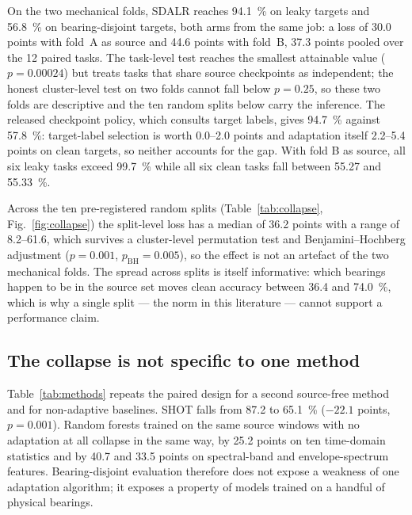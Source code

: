 On the two mechanical folds, SDALR reaches \SI{94.1}{\percent} on leaky targets and \SI{56.8}{\percent} on bearing-disjoint
targets, both arms from the same job: a loss of 30.0 points with fold~A as source and 44.6 points with fold~B, 37.3 points
pooled over the 12 paired tasks. The task-level test reaches the smallest attainable value ($p=0.00024$) but treats tasks
that share source checkpoints as independent; the honest cluster-level test on two folds cannot fall below $p=0.25$, so
these two folds are descriptive and the ten random splits below carry the inference. The released checkpoint policy, which
consults target labels, gives \SI{94.7}{\percent} against \SI{57.8}{\percent}: target-label selection is worth 0.0--2.0
points and adaptation itself 2.2--5.4 points on clean targets, so neither accounts for the gap.
With fold B as source, all six leaky tasks exceed \SI{99.7}{\percent} while all six clean tasks fall between \SI{55.27}{}
and \SI{55.33}{\percent}.

Across the ten pre-registered random splits (Table~\ref{tab:collapse}, Fig.~\ref{fig:collapse}) the split-level loss has a
median of 36.2 points with a range of 8.2--61.6, which survives a cluster-level permutation test and Benjamini--Hochberg
adjustment ($p=0.001$, $p_{\mathrm{BH}}=0.005$), so the effect is not an artefact of the two mechanical folds.
The spread across splits is itself informative: which bearings happen to be in the source set moves clean accuracy between
\SI{36.4}{} and \SI{74.0}{\percent}, which is why a single split --- the norm in this literature --- cannot support a
performance claim.

\subsection{The collapse is not specific to one method}
\label{sec:res-second}





Table~\ref{tab:methods} repeats the paired design for a second source-free method and for non-adaptive baselines. SHOT falls
from \SI{87.2}{} to \SI{65.1}{\percent} ($-22.1$ points, $p=0.001$). Random forests \cite{pedregosa2011sklearn} trained on the same source windows
with no adaptation at all collapse in the same way, by 25.2 points on ten time-domain statistics and by 40.7 and 33.5 points on
spectral-band and envelope-spectrum features. Bearing-disjoint evaluation therefore does not expose a weakness of one
adaptation algorithm; it exposes a property of models trained on a handful of physical bearings.

